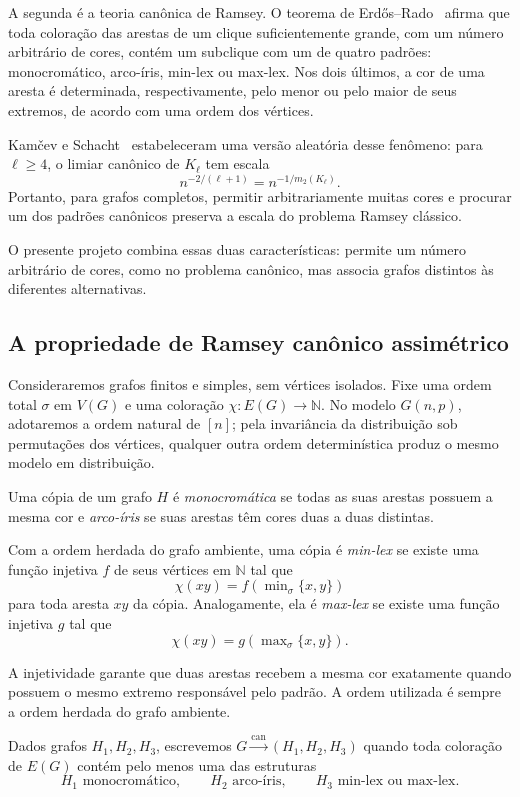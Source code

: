 \documentclass[11pt,a4paper]{article}
\newcommand{\can}{\stackrel{\mathrm{can}}{\longrightarrow}}
\newcommand{\Gnp}{G(n,p)}
\theoremstyle{plain}
\theoremstyle{definition}
\begin{document}
A segunda é a teoria canônica de Ramsey. O teorema de
Erdős--Rado~\cite{ER} afirma que toda coloração das arestas de um clique
suficientemente grande, com um número arbitrário de cores, contém um subclique
com um de quatro padrões: monocromático, arco-íris, min-lex ou max-lex. Nos
dois últimos, a cor de uma aresta é determinada, respectivamente, pelo menor
ou pelo maior de seus extremos, de acordo com uma ordem dos vértices.

Kamčev e Schacht~\cite{KS} estabeleceram uma versão aleatória desse fenômeno:
para $\ell\ge4$, o limiar canônico de $K_\ell$ tem escala
\[
  n^{-2/(\ell+1)}
  =
  n^{-1/m_2(K_\ell)}.
\]
Portanto, para grafos completos, permitir arbitrariamente muitas cores e
procurar um dos padrões canônicos preserva a escala do problema Ramsey
clássico.

O presente projeto combina essas duas características: permite um número
arbitrário de cores, como no problema canônico, mas associa grafos distintos
às diferentes alternativas.


\subsection{A propriedade de Ramsey canônico assimétrico}


Consideraremos grafos finitos e simples, sem vértices isolados. Fixe uma ordem
total $\sigma$ em $V(G)$ e uma coloração
$\chi:E(G)\to\mathbb N.$
No modelo $\Gnp$, adotaremos a ordem natural de $[n]$; pela invariância da
distribuição sob permutações dos vértices, qualquer outra ordem determinística
produz o mesmo modelo em distribuição.

Uma cópia de um grafo $H$ é \emph{monocromática} se todas as suas arestas
possuem a mesma cor e \emph{arco-íris} se suas arestas têm cores duas a duas
distintas.

Com a ordem herdada do grafo ambiente, uma cópia é \emph{min-lex} se existe
uma função injetiva $f$ de seus vértices em $\mathbb N$ tal que
\[
  \chi(xy)
  =
  f\!\left(\min\nolimits_\sigma\{x,y\}\right)
\]
para toda aresta $xy$ da cópia. Analogamente, ela é \emph{max-lex} se existe
uma função injetiva $g$ tal que
\[
  \chi(xy)
  =
  g\!\left(\max\nolimits_\sigma\{x,y\}\right).
\]

A injetividade garante que duas arestas recebem a mesma cor exatamente quando
possuem o mesmo extremo responsável pelo padrão. A ordem utilizada é sempre a
ordem herdada do grafo ambiente.

Dados grafos $H_1,H_2,H_3$, escrevemos
$G\can(H_1,H_2,H_3)$
quando toda coloração de $E(G)$ contém pelo menos uma das estruturas
\[
  H_1\text{ monocromático},\qquad
  H_2\text{ arco-íris},\qquad
  H_3\text{ min-lex ou max-lex}.
\]
\end{document}
